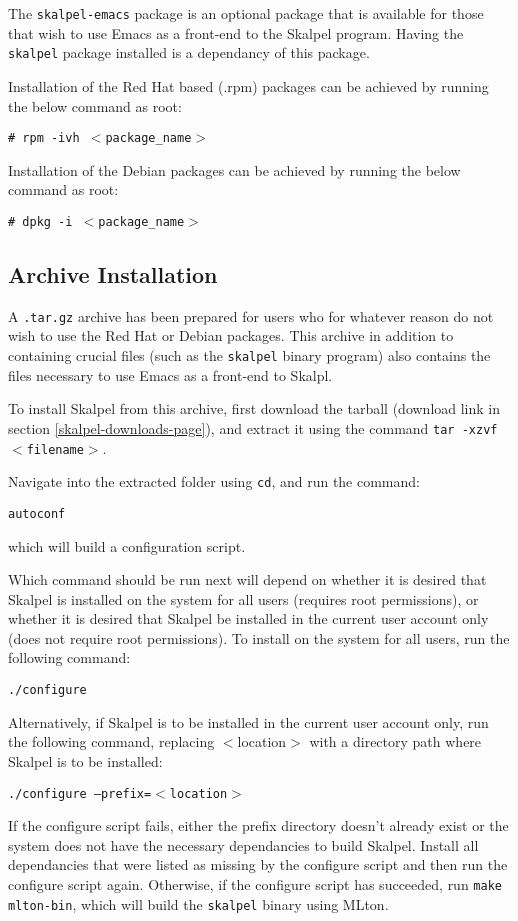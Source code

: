 \documentclass{report}
\begin{document}
The \texttt{skalpel-emacs} package is an optional package that is
available for those that wish to use Emacs as a front-end to the
Skalpel program. Having the \texttt{skalpel} package installed is a
dependancy of this package.

Installation of the Red Hat based (.rpm) packages can be achieved by
running the below command as root:

\texttt{\# rpm -ivh $<$package\_name$>$}

Installation of the Debian packages can be achieved by running the
below command as root:

\texttt{\# dpkg -i $<$package\_name$>$}

\subsection {Archive Installation}
\label{archive-installation}

A \texttt{.tar.gz} archive has been prepared for users who for
whatever reason do not wish to use the Red Hat or Debian
packages. This archive in addition to containing crucial files (such
as the \texttt{skalpel} binary program) also contains the files
necessary to use Emacs as a front-end to Skalpl.

To install Skalpel from this archive, first download the tarball
(download link in section \ref{skalpel-downloads-page}), and extract
it using the command \texttt{tar -xzvf $<$filename$>$}.

Navigate into the extracted folder using \texttt{cd}, and run the command:

\texttt{autoconf}

\noindent which will build a configuration script.

Which command should be run next will depend on whether it is desired
that Skalpel is installed on the system for all users (requires root
permissions), or whether it is desired that Skalpel be installed in the
current user account only (does not require root permissions). To
install on the system for all users, run the following command:

\texttt{./configure}

Alternatively, if Skalpel is to be installed in the current user
account only, run the following command, replacing
$<$location$>$ with a directory path where Skalpel is to be installed:

\texttt{./configure --prefix=$<$location$>$}

If the configure script fails, either the prefix directory doesn't
already exist or the system does not have the necessary dependancies
to build Skalpel. Install all dependancies that were listed as missing
by the configure script and then run the configure script
again. Otherwise, if the configure script has succeeded, run
\texttt{make mlton-bin}, which will build the \texttt{skalpel} binary
using MLton.
\end{document}
